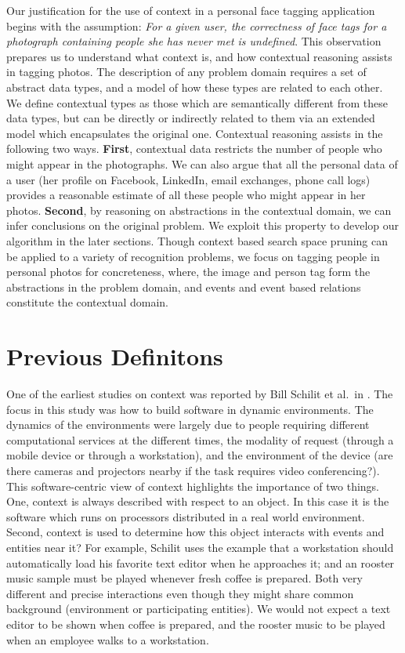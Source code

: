 Our justification for the use of context in a personal face tagging application begins with the assumption: \textit{For a given user, the correctness of face tags for a photograph containing people she has never met is undefined}. This observation prepares us to understand what context is, and how contextual reasoning assists in tagging photos. The description of any problem domain requires a set of abstract data types, and a model of how these types are related to each other. We define contextual types as those which are semantically different from these data types, but can be directly or indirectly related to them via an extended model which encapsulates the original one. Contextual reasoning assists in the following two ways. \textbf{First}, contextual data restricts the number of people who might appear in the photographs. We can also argue that all the personal data of a user (her profile on Facebook, LinkedIn, email exchanges, phone call logs) provides a reasonable estimate of all these people who might appear in her photos. \textbf{Second}, by reasoning on abstractions in the contextual domain, we can infer conclusions on the original problem. We exploit this property to develop our algorithm in the later sections. Though context based search space pruning can be applied to a variety of recognition problems, we focus on tagging people in personal photos for concreteness, where, the image and person tag form the abstractions in the problem domain, and events and event based relations constitute the contextual domain. 

\section{Previous Definitons}

One of the earliest studies on context was reported by Bill Schilit et al.\ in \cite{schilit1994context}. The focus in this study was how to build software in dynamic environments. The dynamics of the environments were largely due to people requiring different computational services at the different times, the modality of request (through a mobile device or through a workstation), and the environment of the device (are there cameras and projectors nearby if the task requires video conferencing?). This software-centric view of context highlights the importance of two things. One, context is always described with respect to an object. In this case it is the software which runs on processors distributed in a real world environment. Second, context is used to determine how this object interacts with events and entities near it? For example, Schilit uses the example that a workstation should automatically load his favorite text editor when he approaches it; and an rooster music sample must be played whenever fresh coffee is prepared. Both very different and precise interactions even though they might share common background (environment or participating entities). We would not expect a text editor to be shown when coffee is prepared, and the rooster music to be played when an employee walks to a workstation.

